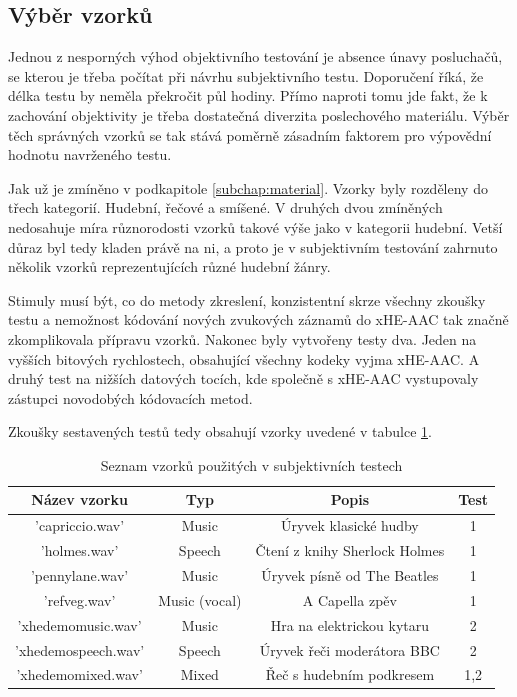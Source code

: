 \subsection{Výběr vzorků}

Jednou z nesporných výhod objektivního testování je absence únavy posluchačů, se kterou je třeba počítat při návrhu subjektivního testu. Doporučení \cite{itur:1534} říká, že délka testu by neměla překročit půl hodiny. Přímo naproti tomu jde fakt, že k zachování objektivity je třeba dostatečná diverzita poslechového materiálu. Výběr těch správných vzorků se tak stává poměrně zásadním faktorem pro výpovědní hodnotu navrženého testu.

Jak už je zmíněno v podkapitole \ref{subchap:material}. Vzorky byly rozděleny do třech kategorií. Hudební, řečové a smíšené. V druhých dvou zmíněných nedosahuje míra různorodosti vzorků takové výše jako v kategorii hudební. Vetší důraz byl tedy kladen právě na ni, a proto je v subjektivním testování zahrnuto několik vzorků reprezentujících různé hudební žánry.

Stimuly musí být, co do metody zkreslení, konzistentní skrze všechny zkoušky testu a nemožnost kódování nových zvukových záznamů do xHE-AAC tak značně zkomplikovala přípravu vzorků. Nakonec byly vytvořeny testy dva. Jeden na vyšších bitových rychlostech, obsahující všechny kodeky vyjma xHE-AAC. A druhý test na nižších datových tocích, kde společně s xHE-AAC vystupovaly zástupci novodobých kódovacích metod.

Zkoušky sestavených testů tedy obsahují vzorky uvedené v tabulce \ref{table:material:subjective}.

\begin{table}[h]
    \centering
    \begin{tabular}{|c|c|c|c|}
    \hline
    Název vzorku & Typ & Popis & Test \\ \hline
    'capriccio.wav' & Music & Úryvek klasické hudby & 1 \\ \hline
    'holmes.wav' & Speech & Čtení z knihy Sherlock Holmes & 1 \\ \hline
    'pennylane.wav' & Music & Úryvek písně od The Beatles & 1 \\ \hline
    'refveg.wav' & Music (vocal) & A Capella zpěv & 1 \\ \hline
    'xhedemomusic.wav' & Music & Hra na elektrickou kytaru & 2 \\ \hline
    'xhedemospeech.wav' & Speech & Úryvek řeči moderátora BBC & 2 \\ \hline
    'xhedemomixed.wav' & Mixed & Řeč s hudebním podkresem & 1,2 \\ \hline
    \end{tabular}
    \caption{Seznam vzorků použitých v subjektivních testech}
    \label{table:material:subjective}
\end{table}

